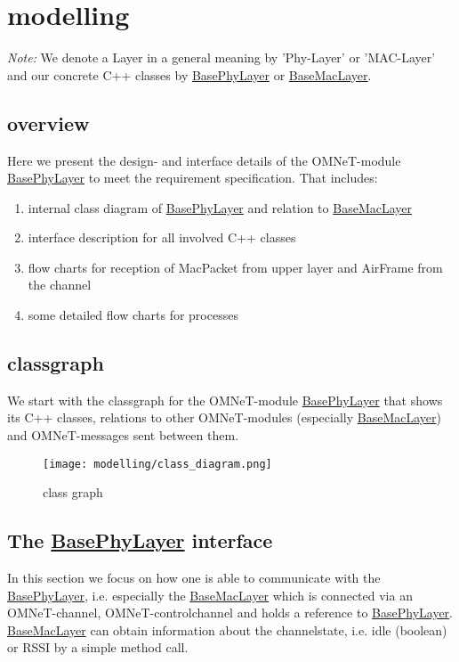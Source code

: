 \newcommand{\h}[1]{\underline{#1}}
\newcommand{\bp}{BasePhyLayer}
\newcommand{\bm}{BaseMacLayer}


\section{modelling}

\emph{Note: }We denote a Layer in a general meaning by 'Phy-Layer' or 'MAC-Layer'
and our concrete C++ classes by \h{\bp} or \h{\bm}.


\subsection{overview}

Here we present the design- and interface details of the OMNeT-module \h{\bp} to meet the requirement specification. That includes:

\begin{enumerate}
 \item internal class diagram of \h{\bp} and relation to \h{\bm}
 \item interface description for all involved C++ classes
 \item flow charts for reception of MacPacket from upper layer and AirFrame from the channel
 \item some detailed flow charts for processes
\end{enumerate}


\subsection{classgraph}

We start with the classgraph for the OMNeT-module \h{\bp} that shows its
C++ classes, relations to other OMNeT-modules (especially \h{\bm})
and OMNeT-messages sent between them.

\begin{figure}[H]
 \centering
 \texttt{[image: modelling/class\_diagram.png]}
 \caption{class graph}
 \label{fig: classgraph}
\end{figure}


\subsection{The \h{\bp} interface}

In this section we focus on how one is able to communicate with the \h{\bp}, i.e. 
especially the \h{\bm} which is connected via an OMNeT-channel, OMNeT-controlchannel and holds a reference to \h{\bp}.
\h{\bm} can obtain information about the channelstate, i.e. idle (boolean) or RSSI by a simple method call.

